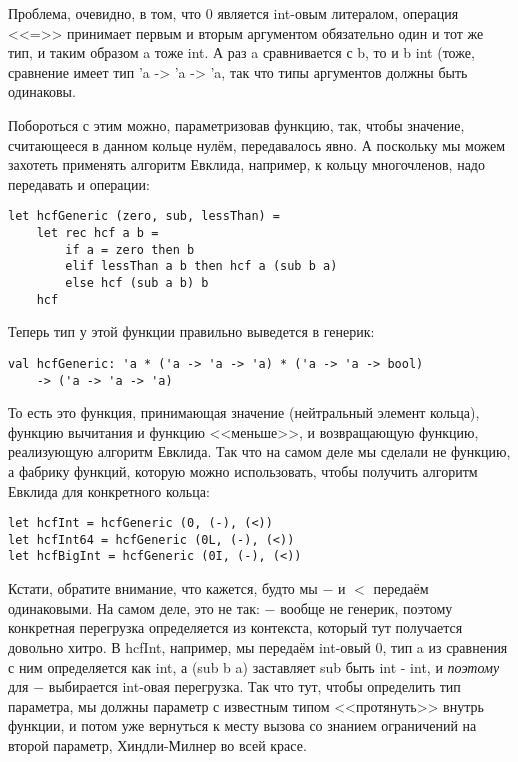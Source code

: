 \documentclass[a5paper]{article}
\begin{document}
Проблема, очевидно, в том, что 0 является int-овым литералом, операция <<=>> принимает первым и вторым аргументом обязательно один и тот же тип, и таким образом a тоже int. А раз a сравнивается с b, то и b int (тоже, сравнение имеет тип  'a -> 'a -> 'a, так что типы аргументов должны быть одинаковы.

Побороться с этим можно, параметризовав функцию, так, чтобы значение, считающееся в данном кольце нулём, передавалось явно. А поскольку мы можем захотеть применять алгоритм Евклида, например, к кольцу многочленов, надо передавать и операции:

\begin{verbatim}
let hcfGeneric (zero, sub, lessThan) =
    let rec hcf a b =
        if a = zero then b
        elif lessThan a b then hcf a (sub b a)
        else hcf (sub a b) b
    hcf    
\end{verbatim}

Теперь тип у этой функции правильно выведется в генерик:

\begin{verbatim}
val hcfGeneric: 'a * ('a -> 'a -> 'a) * ('a -> 'a -> bool) 
    -> ('a -> 'a -> 'a)
\end{verbatim}

То есть это функция, принимающая значение (нейтральный элемент кольца), функцию вычитания и функцию <<меньше>>, и возвращающую функцию, реализующую алгоритм Евклида. Так что на самом деле мы сделали не функцию, а фабрику функций, которую можно использовать, чтобы получить алгоритм Евклида для конкретного кольца:

\begin{verbatim}
let hcfInt = hcfGeneric (0, (-), (<))
let hcfInt64 = hcfGeneric (0L, (-), (<))
let hcfBigInt = hcfGeneric (0I, (-), (<))
\end{verbatim}

Кстати, обратите внимание, что кажется, будто мы $-$ и $<$ передаём одинаковыми. На самом деле, это не так: $-$ вообще не генерик, поэтому конкретная перегрузка определяется из контекста, который тут получается довольно хитро. В hcfInt, например, мы передаём int-овый 0, тип a из сравнения с ним определяется как int, а (sub b a) заставляет sub быть int - int, и \emph{поэтому} для $-$ выбирается int-овая перегрузка. Так что тут, чтобы определить тип параметра, мы должны параметр с известным типом <<протянуть>> внутрь функции, и потом уже вернуться к месту вызова со знанием ограничений на второй параметр, Хиндли-Милнер во всей красе.
\end{document}
